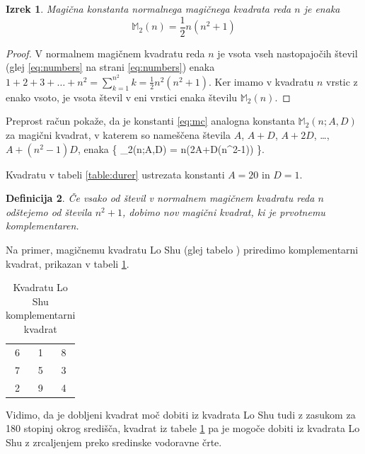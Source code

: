 \documentclass[a4paper,12pt]{article}
\newtheorem{izrek}{Izrek}[section]
\newtheorem{definicija}[izrek]{Definicija}
\newcommand{\m}{\mathbb{M}_2}
\newcommand{\pojem}[1]{\emph{}{\color{purple}#1}}
\begin{document}
\begin{izrek}
   Magična konstanta normalnega magičnega kvadrata reda $n$
   je enaka
   \begin{equation}
      \label{eq:mc}
      \m(n) = \frac{1}{2} n(n^2+1)
   \end{equation}
\end{izrek}

\begin{proof}
      V normalnem magičnem kvadratu reda $n$ je vsota vseh nastopajočih
      števil (glej \eqref{eq:numbers} na strani \eqref{eq:numbers}) enaka
      $1+2+3+\dots+n^2=\sum_{k=1}^{n^2}k=\frac{1}{2}n^2(n^2+1)$. Ker imamo
      v kvadratu $n$ vrstic z enako vsoto, je vsota števil v eni vrstici
      enaka številu $\m(n)$. %
\end{proof}

Preprost račun pokaže, da je konstanti \eqref{eq:mc} analogna konstanta
$\m(n;A,D)$ za magični kvadrat, v katerem so nameščena števila
$A$, $A+D$, $A+2D$, \dots, $A+(n^2-1)D$, enaka \{
   \m(n;A,D) = n(2A+D(n^2-1))
\}.%

Kvadratu v tabeli \ref{table:durer} ustrezata konstanti $A=20$ in $D=1$.

\begin{definicija}
      Če vsako od števil v normalnem magičnem kvadratu reda $n$ odštejemo
      od števila $n^2+1$, dobimo nov magični kvadrat, ki je prvotnemu
      \pojem{komplementaren}.
\end{definicija}

Na primer, magičnemu kvadratu Lo Shu (glej tabelo \cite{lo shu}) priredimo
komplementarni kvadrat, prikazan v tabeli \ref{table:closhu}.
%
\begin{table}
   \centering
   \caption{Kvadratu Lo Shu komplementarni kvadrat}
   \label{table:closhu}
   \begin{tabular}{ccc}\toprule
      6 & 1 & 8 \\
      7 & 5 & 3 \\
      2 & 9 & 4 \\ \bottomrule
   \end{tabular}
\end{table}

Vidimo, da je dobljeni kvadrat moč dobiti iz kvadrata Lo Shu tudi z zasukom za
180 stopinj okrog središča, kvadrat iz tabele \ref{table:closhu} pa je mogoče dobiti
iz kvadrata Lo Shu z zrcaljenjem preko sredinske vodoravne črte.
\end{document}
